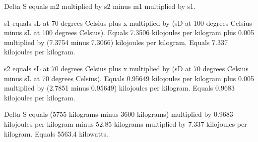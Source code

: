 Delta S equals m2 multiplied by s2 minus m1 multiplied by s1.  

s1 equals sL at 70 degrees Celsius plus x multiplied by (sD at 100 degrees Celsius minus sL at 100 degrees Celsius).  
Equals 7.3506 kilojoules per kilogram plus 0.005 multiplied by (7.3754 minus 7.3066) kilojoules per kilogram.  
Equals 7.337 kilojoules per kilogram.  

s2 equals sL at 70 degrees Celsius plus x multiplied by (sD at 70 degrees Celsius minus sL at 70 degrees Celsius).  
Equals 0.95649 kilojoules per kilogram plus 0.005 multiplied by (2.7851 minus 0.95649) kilojoules per kilogram.  
Equals 0.9683 kilojoules per kilogram.  

Delta S equals (5755 kilograms minus 3600 kilograms) multiplied by 0.9683 kilojoules per kilogram minus 52.85 kilograms multiplied by 7.337 kilojoules per kilogram.  
Equals 5563.4 kilowatts.